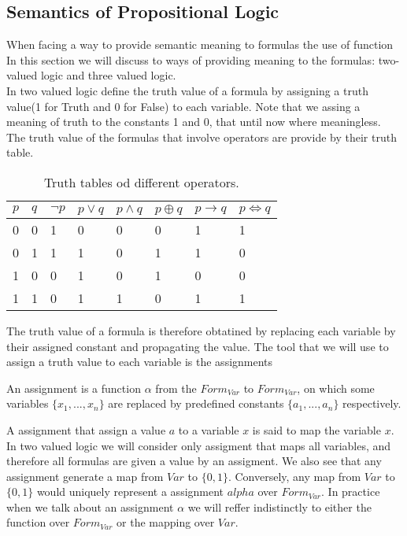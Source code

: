 \begin{definition}
\subsection{Semantics of Propositional Logic}
When facing a way to provide semantic meaning to formulas the use of function In this section we will discuss to ways of providing meaning to the formulas: two-valued logic and three valued logic.\\ 

    In two valued logic define the truth value of a formula by assigning a truth value(1 for Truth and 0 for False) to each variable. Note that we assing a meaning of truth to the constants 1 and 0, that until now where meaningless. The truth value of the formulas that involve operators are provide by their truth table.


\begin{table}[h]
\begin{center}
\begin{tabular}{|l|l|l|l|l|l|l|l|}
\hline
$p$ & $q$ & $\neg p$& $p\vee q$ & $p\wedge q$ & $p \oplus q$ & $p \to q $ & $p \iff q$  \\ 
\hline
  0 & 0 & 1 & 0 & 0 & 0 & 1&1\\
  0 & 1 & 1 & 1 & 0 & 1 & 1&0\\
  1 & 0 & 0 & 1 & 0 & 1 & 0&0\\
  1 & 1 & 0 & 1 & 1 & 0 & 1&1\\\hline
\end{tabular}
\end{center}
\caption{\label{tab:table-name}Truth tables od different operators.}
\end{table}


The truth value of a formula is therefore obtatined by replacing each variable by their assigned constant and propagating the value. The tool that we will use to assign a truth value to each variable is the assignments
    \begin{definition}
      An assignment is a function $\alpha$ from the $Form_{Var}$ to $Form_{Var}$, on which some variables $\{x_1,...,x_n \}$ are replaced by predefined constants $\{a_1,...,a_n\}$ respectively.\\
    \end{definition}

    A assignment that assign a value $a$ to a variable $x$ is said to map the variable $x$. In two valued logic we will consider only assigment that maps all variables, and therefore all formulas are given a value by an assigment. We also see that any assignment generate a map from $Var$ to $\{0,1\}$. Conversely, any map from $Var$ to $\{0,1\}$ would uniquely represent a assignment $alpha$ over $Form_{Var}$. In practice when we talk about an assignment $\alpha$ we will reffer indistinctly to either the function over $Form_{Var}$ or the mapping  over $Var$.\\


\end{definition}
